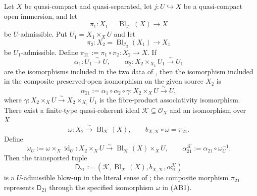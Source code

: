 \begin{lemma}
  \label{lemma:nagata-admissible-blowup-comp}
  \lean{}

  Let $X$ be quasi-compact and quasi-separated, let
  $j\colon U\hookrightarrow X$ be a quasi-compact open immersion, and let
  \[
    \pi_1\colon X_1=\operatorname{Bl}_{\mathcal I_1}(X)\to X
  \]
  be $U$-admissible.  Put $U_1=X_1\times_XU$ and let
  \[
    \pi_2\colon X_2=\operatorname{Bl}_{\mathcal I_2}(X_1)\to X_1
  \]
  be $U_1$-admissible.  Define
  $\pi_{21}:=\pi_1\circ\pi_2\colon X_2\to X$.  If
  \[
    \alpha_1\colon U_1\xrightarrow{\sim}U,
    \qquad
    \alpha_2\colon X_2\times_{X_1}U_1\xrightarrow{\sim}U_1
  \]
  are the isomorphisms included in the two data of
  , then the isomorphism included in the
  composite preserved-open isomorphism on the given source $X_2$ is
  \[
    \alpha_{21}:=\alpha_1\circ\alpha_2\circ\gamma
      \colon X_2\times_XU\xrightarrow{\sim}U,
  \]
  where
  $\gamma\colon X_2\times_XU\xrightarrow{\sim}
    X_2\times_{X_1}U_1$ is the fibre-product associativity isomorphism.
  There exist a finite-type quasi-coherent ideal
  $\mathcal K\subseteq\mathcal O_X$ and an isomorphism over $X$
  \[
    \omega\colon X_2\xrightarrow{\sim}\operatorname{Bl}_{\mathcal K}(X),
    \qquad
    b_{X,\mathcal K}\circ\omega=\pi_{21}.                      \tag{AB1}
  \]
  Define
  \[
    \omega_U:=\omega\times_X\operatorname{id}_U
      \colon X_2\times_XU\xrightarrow{\sim}
        \operatorname{Bl}_{\mathcal K}(X)\times_XU,
    \qquad
    \alpha_{21}^{\mathcal K}:=
      \alpha_{21}\circ\omega_U^{-1}.                          \tag{AB2}
  \]
  Then the transported tuple
  \[
    \mathsf D_{21}:=
      (\mathcal K,\operatorname{Bl}_{\mathcal K}(X),
        b_{X,\mathcal K},\alpha_{21}^{\mathcal K})             \tag{AB3}
  \]
  is a $U$-admissible blow-up in the literal sense of
  ; the composite morphism
  $\pi_{21}$ represents $\mathsf D_{21}$ through the specified isomorphism
  $\omega$ in (AB1).
\end{lemma}

